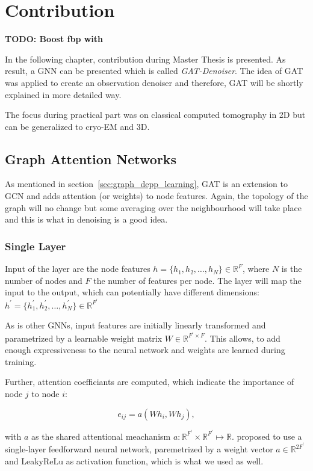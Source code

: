 \chapter{Contribution}
\label{sec:contribution}

\textbf{TODO: Boost fbp with \cite{ct-reconstruction-comparison}}

In the following chapter, contribution during Master Thesis is presented.
As result, a GNN can be presented which is called \textit{GAT-Denoiser}.
The idea of GAT was applied to create an observation denoiser and therefore, GAT
will be shortly explained in more detailed way.

The focus during practical part was on classical computed tomography in 2D but
can be generalized to cryo-EM and 3D.

\section{Graph Attention Networks}
As mentioned in section~\ref{sec:graph_depp_learning}, GAT is an extension to GCN and 
adds attention (or weights) to node features. Again, the topology of the graph will no
change but some averaging over the neighbourhood will take place and this is what 
in denoising is a good idea.

\subsection{Single Layer}
Input of the layer are the node features $h = \{ h_1, h_2, \dots , h_N \} \in \mathbb{R}^F$, 
where $N$ is the number of nodes and $F$ the number of features per node. 
The layer will map the input to the output, which can potentially have different dimensions: 
$h^{\prime} = \{ h_1^{\prime}, h_2^{\prime}, \dots, h_N^{\prime} \} \in \mathbb{R}^{F^{\prime}} $

As is other GNNs, input features are initially 
linearly transformed and parametrized by a learnable weight matrix $W \in \mathbb{R}^{F^{\prime} \times F}$.
This allows, to add enough expressiveness to the neural network and weights are learned during training.

Further, attention coefficiants are computed, which indicate the importance of node $j$ to node $i$:

\begin{equation}
  e_{ij} = a(Wh_i, Wh_j),
\end{equation}

with $a$ as the shared attentional meachanism $a : \mathbb{R}^{F^{\prime}} \times \mathbb{R}^{F^{\prime}} \mapsto \mathbb{R}$.
\citet{GAT} proposed to use a single-layer feedforward neural network, paremetrized by a weight vector $a \in \mathbb{R}^{2F^{\prime}}$
and LeakyReLu as activation function, which is what we used as well.
 
